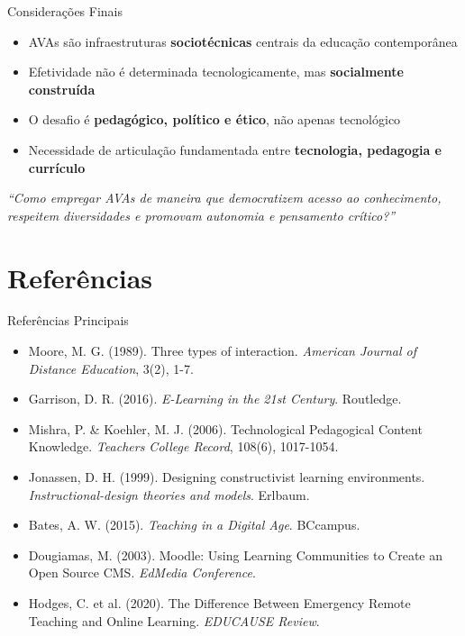 \documentclass[aspectratio=169,xcolor=table]{beamer}
\begin{document}
\begin{frame}{Considerações Finais}
    \begin{itemize}
        \item AVAs são infraestruturas \textbf{sociotécnicas} centrais da educação contemporânea
        \item Efetividade não é determinada tecnologicamente, mas \textbf{socialmente construída}
        \item O desafio é \textbf{pedagógico, político e ético}, não apenas tecnológico
        \item Necessidade de articulação fundamentada entre \textbf{tecnologia, pedagogia e currículo}
    \end{itemize}
    \vspace{0.5cm}
    \centering
    \textit{``Como empregar AVAs de maneira que democratizem acesso ao conhecimento,\\ respeitem diversidades e promovam autonomia e pensamento crítico?''}
\end{frame}

\section{Referências}

\begin{frame}{Referências Principais}
    \tiny
    \begin{itemize}
        \item Moore, M. G. (1989). Three types of interaction. \textit{American Journal of Distance Education}, 3(2), 1-7.
        \item Garrison, D. R. (2016). \textit{E-Learning in the 21st Century}. Routledge.
        \item Mishra, P. \& Koehler, M. J. (2006). Technological Pedagogical Content Knowledge. \textit{Teachers College Record}, 108(6), 1017-1054.
        \item Jonassen, D. H. (1999). Designing constructivist learning environments. \textit{Instructional-design theories and models}. Erlbaum.
        \item Bates, A. W. (2015). \textit{Teaching in a Digital Age}. BCcampus.
        \item Dougiamas, M. (2003). Moodle: Using Learning Communities to Create an Open Source CMS. \textit{EdMedia Conference}.
        \item Hodges, C. et al. (2020). The Difference Between Emergency Remote Teaching and Online Learning. \textit{EDUCAUSE Review}.
    \end{itemize}
\end{frame}
\end{document}
